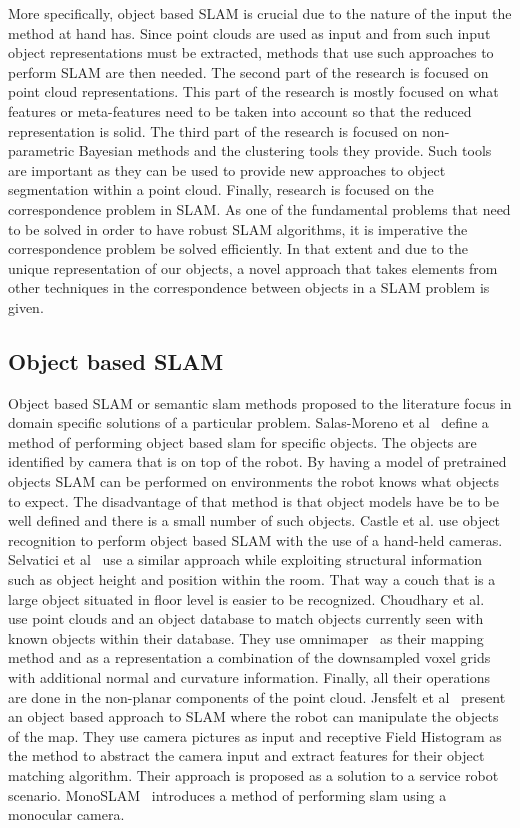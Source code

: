 \documentclass[twoside,hidelinks]{article}
\begin{document}
More specifically, object based SLAM is crucial due to the nature of the input the method at hand has. Since point clouds are used as input and from such input object representations must be extracted, methods that use such approaches to perform SLAM are then needed. The second part of the research is focused on point cloud representations. This part of the research is mostly focused on what features or meta-features need to be taken into account so that the reduced representation is solid. The third part of the research is focused on non-parametric Bayesian methods and the clustering tools they provide. Such tools are important as they can be used to provide new approaches to object segmentation within a point cloud. Finally, research is focused on the correspondence problem in SLAM. As one of the fundamental problems that need to be solved in order to have robust SLAM algorithms, it is imperative the correspondence problem be solved efficiently. In that extent and due to the unique representation of our objects, a novel approach that takes elements from other techniques in the correspondence between objects in a SLAM problem is given.

\subsection{Object based SLAM}
Object based SLAM or semantic slam methods proposed to the literature focus in domain specific solutions of a particular problem. Salas-Moreno et al~\cite{slam++} define a method of performing object based slam for specific objects. The objects are identified by camera that is on top of the robot. By having a model of pretrained objects SLAM can be performed on environments the robot knows what objects to expect. The disadvantage of that method is that object models have be to be well defined and there is a small number of such objects. 
Castle et al. use object recognition to perform object based SLAM with the use of a hand-held cameras. Selvatici et al~\cite{objslam} use a similar approach while exploiting structural information such as object height and position within the room. That way a couch that is a large object situated in floor level is easier to be recognized.
Choudhary et al.~\cite{objectpointslam} use point clouds and an object database to match objects currently seen with known objects within their database. They use omnimaper~\cite{omnimaper} as their mapping method and as a representation a combination of the downsampled  voxel grids with additional normal and curvature information.  Finally, all their operations are done in the non-planar components of the point cloud.
Jensfelt et al~\cite{objslam} present an object based approach to SLAM where the robot can manipulate the objects of the map. They use camera pictures as input and receptive Field Histogram as the method to abstract the camera input and extract features for their object matching algorithm. Their approach is proposed as a solution to a service robot scenario.
MonoSLAM~\cite{monoslam} introduces a method of performing slam using a monocular camera. 
\end{document}
